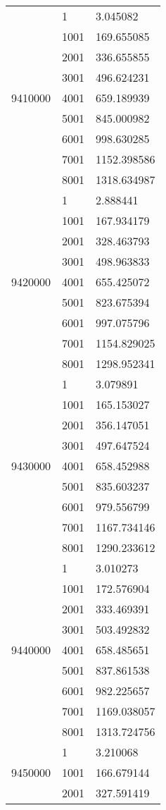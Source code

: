 \begin{table}[htb!]
\begin{tabular}{lll}
\multirow[c]{9}{*}{9410000} & 1 & 3.045082 \\
 & 1001 & 169.655085 \\
 & 2001 & 336.655855 \\
 & 3001 & 496.624231 \\
 & 4001 & 659.189939 \\
 & 5001 & 845.000982 \\
 & 6001 & 998.630285 \\
 & 7001 & 1152.398586 \\
 & 8001 & 1318.634987 \\
\multirow[c]{9}{*}{9420000} & 1 & 2.888441 \\
 & 1001 & 167.934179 \\
 & 2001 & 328.463793 \\
 & 3001 & 498.963833 \\
 & 4001 & 655.425072 \\
 & 5001 & 823.675394 \\
 & 6001 & 997.075796 \\
 & 7001 & 1154.829025 \\
 & 8001 & 1298.952341 \\
\multirow[c]{9}{*}{9430000} & 1 & 3.079891 \\
 & 1001 & 165.153027 \\
 & 2001 & 356.147051 \\
 & 3001 & 497.647524 \\
 & 4001 & 658.452988 \\
 & 5001 & 835.603237 \\
 & 6001 & 979.556799 \\
 & 7001 & 1167.734146 \\
 & 8001 & 1290.233612 \\
\multirow[c]{9}{*}{9440000} & 1 & 3.010273 \\
 & 1001 & 172.576904 \\
 & 2001 & 333.469391 \\
 & 3001 & 503.492832 \\
 & 4001 & 658.485651 \\
 & 5001 & 837.861538 \\
 & 6001 & 982.225657 \\
 & 7001 & 1169.038057 \\
 & 8001 & 1313.724756 \\
\multirow[c]{9}{*}{9450000} & 1 & 3.210068 \\
 & 1001 & 166.679144 \\
 & 2001 & 327.591419 \\

\end{tabular}
\end{table}
